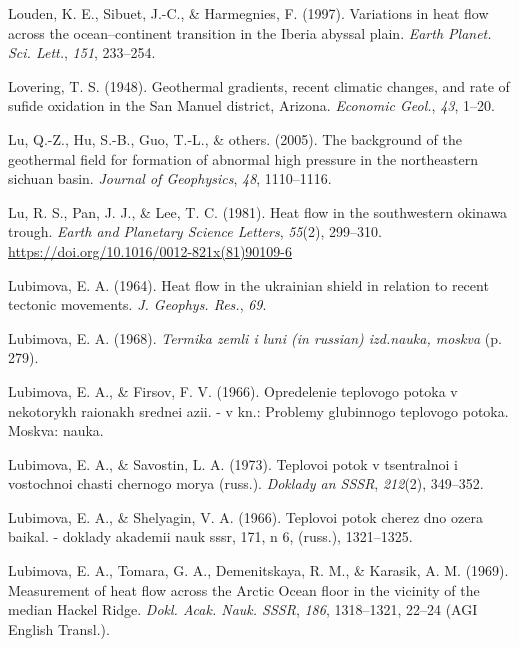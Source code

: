 \documentclass[draft,linenumbers]{agujournal2018}
\begin{document}
\leavevmode{}%
Louden, K. E., Sibuet, J.-C., \& Harmegnies, F. (1997). Variations in
heat flow across the ocean--continent transition in the {Iberia} abyssal
plain. \emph{Earth Planet. Sci. Lett.}, \emph{151}, 233--254.

\leavevmode{}%
Lovering, T. S. (1948). Geothermal gradients, recent climatic changes,
and rate of sufide oxidation in the {San Manuel} district, {Arizona}.
\emph{Economic Geol.}, \emph{43}, 1--20.

\leavevmode{}%
Lu, Q.-Z., Hu, S.-B., Guo, T.-L., \& others. (2005). The background of
the geothermal field for formation of abnormal high pressure in the
northeastern sichuan basin. \emph{Journal of Geophysics}, \emph{48},
1110--1116.

\leavevmode{}%
Lu, R. S., Pan, J. J., \& Lee, T. C. (1981). Heat flow in the
southwestern okinawa trough. \emph{Earth and Planetary Science Letters},
\emph{55}(2), 299--310.
\url{https://doi.org/10.1016/0012-821x(81)90109-6}

\leavevmode{}%
Lubimova, E. A. (1964). Heat flow in the ukrainian shield in relation to
recent tectonic movements. \emph{J. Geophys. Res.}, \emph{69}.

\leavevmode{}%
Lubimova, E. A. (1968). \emph{Termika zemli i luni (in russian)
izd.nauka, moskva} (p. 279).

\leavevmode{}%
Lubimova, E. A., \& Firsov, F. V. (1966). Opredelenie teplovogo potoka v
nekotorykh raionakh srednei azii. - v kn.: Problemy glubinnogo teplovogo
potoka. Moskva: nauka.

\leavevmode{}%
Lubimova, E. A., \& Savostin, L. A. (1973). Teplovoi potok v tsentralnoi
i vostochnoi chasti chernogo morya (russ.). \emph{Doklady an SSSR},
\emph{212}(2), 349--352.

\leavevmode{}%
Lubimova, E. A., \& Shelyagin, V. A. (1966). Teplovoi potok cherez dno
ozera baikal. - doklady akademii nauk sssr, 171, n 6, (russ.),
1321--1325.

\leavevmode{}%
Lubimova, E. A., Tomara, G. A., Demenitskaya, R. M., \& Karasik, A. M.
(1969). Measurement of heat flow across the {Arctic Ocean} floor in the
vicinity of the median {Hackel Ridge}. \emph{Dokl. Acak. Nauk. SSSR},
\emph{186}, 1318--1321, 22--24 (AGI English Transl.).
\end{document}
